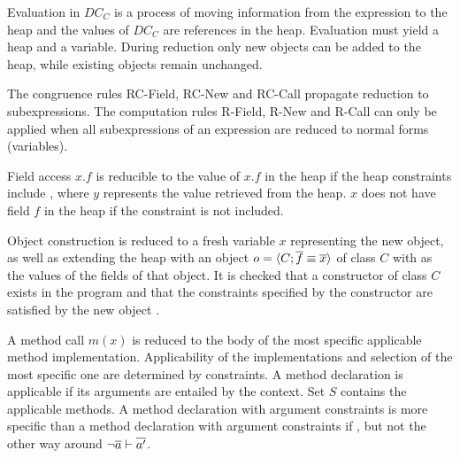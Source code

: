 Evaluation in $DC_C$ is a process of moving information from the expression to the heap
and the values of $DC_C$ are references in the heap.
Evaluation must yield a heap and a variable.
During reduction only new objects can be added to the heap,
while existing objects remain unchanged.

The congruence rules RC-Field, RC-New and RC-Call propagate reduction to subexpressions.
The computation rules R-Field, R-New and R-Call can only be applied
when all subexpressions of an expression are reduced to normal forms (variables).

Field access $x.f$ is reducible to the value of $x.f$ in the heap
if the heap constraints include ,
where $y$ represents the value retrieved from the heap.
$x$ does not have field $f$ in the heap if the constraint is not included.

Object construction  is reduced
to a fresh variable $x$ representing the new object,
as well as extending the heap with an object $o = \langle C; \overline{f} \equiv \overline{x} \rangle$ of class $C$ with
 as the values of the fields of that object.
It is checked that a constructor of class $C$ exists in the program
and that the constraints  specified by the constructor
are satisfied by the new object .

A method call $m(x)$ is reduced to the body of the most specific applicable method implementation.
Applicability of the implementations and selection of the most specific one
are determined by constraints.
A method declaration is applicable if its arguments are entailed by the context.
Set $S$ contains the applicable methods.
A method declaration with argument constraints 
is more specific than a method declaration with argument constraints 
if ,
but not the other way around $\neg\overline{a} \vdash \overline{a'}$.

